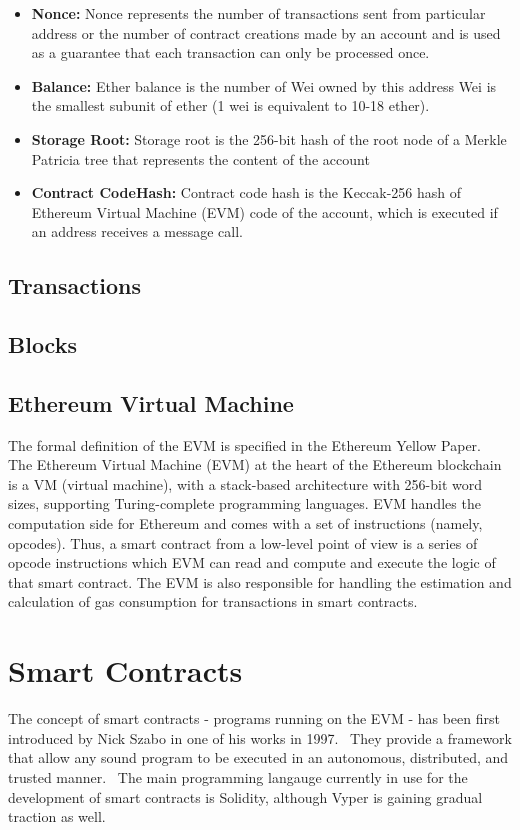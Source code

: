         \begin{itemize}
            \item \textbf{Nonce:} Nonce represents the number of transactions sent from particular address or the number of contract creations made by an account and is used as a guarantee that each transaction can only be processed once.
            \item \textbf{Balance:} Ether balance is the number of Wei owned by this address
                Wei is the smallest subunit of ether (1 wei is equivalent to 10-18 ether).
            \item \textbf{Storage Root:} Storage root is the 256-bit hash of the root node of a Merkle Patricia tree that represents the content of the account 
            \item \textbf{Contract CodeHash:} Contract code hash is the Keccak-256 hash of Ethereum Virtual Machine (EVM) code of the account, which is executed if an address receives a message call.
        \end{itemize}

    \subsection{Transactions}

    \subsection{Blocks}

    \subsection{Ethereum Virtual Machine}
        The formal definition of the EVM is specified in the Ethereum Yellow Paper.~\cite{wood2014ethereum}
        The Ethereum Virtual Machine (EVM) at the heart of the Ethereum blockchain is a VM (virtual machine), with a stack-based architecture with 256-bit word sizes, supporting Turing-complete programming languages.
        EVM handles the computation side for Ethereum and comes with a set of instructions (namely, opcodes).
        Thus, a smart contract from a low-level point of view is a series of opcode instructions which EVM can read and compute and execute the logic of that smart contract.
        The EVM is also responsible for handling the estimation and calculation of gas consumption for transactions in smart contracts.

\section{Smart Contracts}
    The concept of smart contracts - programs running on the EVM - has been first introduced by Nick Szabo in one of his works in 1997.~\cite{szabo1997formalizing}
    They provide a framework that allow any sound program to be executed in an autonomous, distributed, and trusted manner.~\cite{nguyen2020sfuzz}
    The main programming langauge currently in use for the development of smart contracts is Solidity, although Vyper is gaining gradual traction as well.


